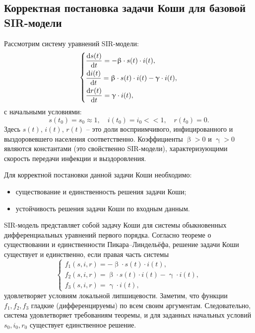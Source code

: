 \documentclass[a4paper, 14pt]{extreport}
\numberwithin{equation}{section}
\renewcommand{\beta}{\upbeta}
\renewcommand{\gamma}{\upgamma}
\begin{document}
	\subsection{Корректная постановка задачи Коши для базовой SIR-модели} 
	Рассмотрим систему уравнений SIR-модели:
	\[
	\begin{dcases}
		\dfrac{\mathrm{d}s(t)}{\mathrm{d}t} = -\beta \cdot s(t) \cdot i(t),\\
		\dfrac{\mathrm{d}i(t)}{\mathrm{d}t} = \beta \cdot s(t) \cdot i(t) - \gamma \cdot i(t),\\
		\dfrac{\mathrm{d}r(t)}{\mathrm{d}t} = \gamma \cdot i(t),
	\end{dcases}
	\]
	с начальными условиями:
	\[
	s(t_0) = s_0 \approx 1, \quad i(t_0) = i_0 << 1, \quad r(t_0) = 0.
	\]
	Здесь \( s(t) \), \( i(t) \), \( r(t) \) -- это доли восприимчивого, инфицированного и выздоровевшего населения соответственно. Коэффициенты \( \beta > 0 \) и \( \gamma > 0 \) являются константами (это свойственно SIR-модели), характеризующими скорость передачи инфекции и выздоровления.
	
	Для корректной постановки данной задачи Коши необходимо:
	\begin{itemize}
		\item существование и единственность решения задачи Коши;
		\item устойчивость решения задачи Коши по входным данным.
	\end{itemize}
	
	SIR-модель представляет собой задачу Коши для системы обыкновенных дифференциальных уравнений первого порядка. Согласно теореме о существовании и единственности Пикара–Линдельёфа, решение задачи Коши существует и единственно, если правая часть системы
	\[
	\begin{cases}
		f_1(s, i, r) = -\beta \cdot s(t)\cdot  i(t),\\
		f_2(s, i, r) = \beta \cdot s(t)\cdot  i(t) - \gamma \cdot i(t),\\
		f_3(s, i, r) = \gamma\cdot  i(t),
	\end{cases}
	\]
	удовлетворяет условиям локальной липшицевости. Заметим, что функции \( f_1, f_2, f_3 \) гладкие (дифференцируемы) по всем своим аргументам. Следовательно, система удовлетворяет требованиям теоремы, и для заданных начальных условий \( s_0, i_0, r_0 \) существует единственное решение.
	
\end{document}
